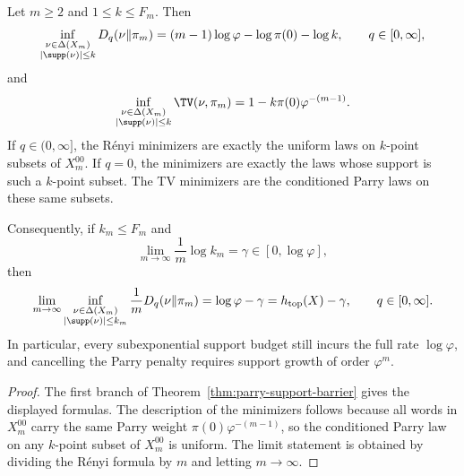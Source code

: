 \begin{corollary}\label{cor:exact-complexity-divergence-law}
Let \(m\ge 2\) and \(1\le k\le F_m\). Then
\[
\inf_{\substack{\nu\in\Delta(X_m)\\ |\supp(\nu)|\le k}}D_q(\nu\|\pi_m)
=
(m-1)\log\varphi-\log\pi(0)-\log k,
\qquad q\in[0,\infty],
\]
and
\[
\inf_{\substack{\nu\in\Delta(X_m)\\ |\supp(\nu)|\le k}}\TV(\nu,\pi_m)
=
1-k\pi(0)\varphi^{-(m-1)}.
\]
If \(q\in(0,\infty]\), the R\'enyi minimizers are exactly the uniform laws on
\(k\)-point subsets of \(X_m^{00}\). If \(q=0\), the minimizers are exactly the
laws whose support is such a \(k\)-point subset. The TV minimizers are the
conditioned Parry laws on these same subsets.

Consequently, if \(k_m\le F_m\) and
\[
\lim_{m\to\infty}\frac{1}{m}\log k_m=\gamma\in[0,\log\varphi],
\]
then
\[
\lim_{m\to\infty}
\inf_{\substack{\nu\in\Delta(X_m)\\ |\supp(\nu)|\le k_m}}
\frac{1}{m}D_q(\nu\|\pi_m)
=
\log\varphi-\gamma
=
h_{\mathrm{top}}(X)-\gamma,
\qquad q\in[0,\infty].
\]
In particular, every subexponential support budget still incurs the full rate
\(\log\varphi\), and cancelling the Parry penalty requires support growth of
order \(\varphi^m\).
\end{corollary}

\begin{proof}
The first branch of Theorem~\ref{thm:parry-support-barrier} gives the displayed
formulas. The description of the minimizers follows because all words in
\(X_m^{00}\) carry the same Parry weight \(\pi(0)\varphi^{-(m-1)}\), so the
conditioned Parry law on any \(k\)-point subset of \(X_m^{00}\) is uniform.
The limit statement is obtained by dividing the R\'enyi formula by \(m\) and
letting \(m\to\infty\).
\end{proof}
